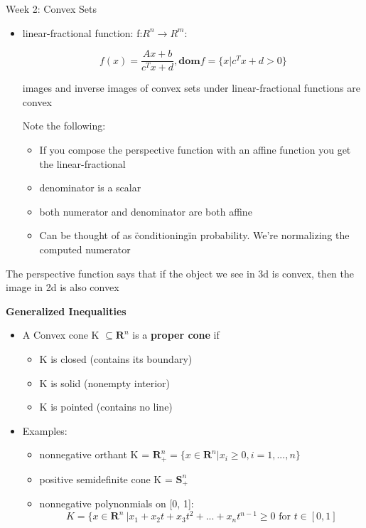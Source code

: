 \documentclass{article}
\begin{document}
\begin{homeworkProblemName}{{\LARGE Week 2: Convex Sets}}
\begin{problemAnswer}
{\begin{itemize}
      \item linear-fractional function: f:$ R^n \rightarrow R^m$:

        \[f(x) = \frac{Ax + b}{c^Tx + d}, \textbf{dom} f = \{x | c^Tx + d >
          0\}\]

        images and inverse images of convex sets under linear-fractional
        functions are convex

        Note the following:
        \begin{itemize}
        \item If you compose the perspective function with an affine function
          you get the linear-fractional
        \item denominator is a scalar
        \item both numerator and denominator are both affine
        \item Can be thought of as \"conditioning\" in probability. We're
          normalizing the computed numerator
        \end{itemize}
      \end{itemize}

      The perspective function says that if the object we see in 3d is convex,
      then the image in 2d is also convex
    }\end{problemAnswer}


  \newpage

  \vspace{0.2 cm} \textbf{{\large Generalized Inequalities}}

  \begin{problemAnswer}{
      \begin{itemize}
      \item A Convex cone K $\subseteq \bm{R}^n$ is a \textbf{proper cone} if
        \begin{itemize}
        \item K is closed (contains its boundary)
        \item K is solid (nonempty interior)
        \item K is pointed (contains no line)
        \end{itemize}

      \item Examples:
        \begin{itemize}
          \item nonnegative orthant K = $\bm{R}^n_+ = \{x \in \bm{R}^n | x_i \geq 0,
            i = 1, ..., n\}$
          \item positive semidefinite cone K = $\bm{S}^n_+$
          \item nonnegative polynonmials on [0, 1]:
           $$K = \{ x \in \bm{R}^n\ | x_1 + x_2t + x_3t^2 + ... + x_nt^{n - 1} \geq
           0 \text{ for } t \in [0, 1]$$
         \end{itemize}


\end{itemize}}
\end{problemAnswer}
\end{homeworkProblemName}
\end{document}
